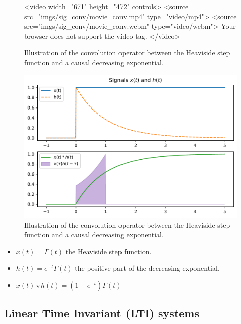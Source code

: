 \begin{warpHTML}
  \begin{figure}[ht]
    \centering
    <video width="671" height="472" controls>
    <source src="imgs/sig\_conv/movie\_conv.mp4" type="video/mp4">
    <source src="imgs/sig\_conv/movie\_conv.webm" type="video/webm">
    Your browser does not support the video tag.
    </video>   
    \caption{Illustration of the convolution operator between the Heaviside step function and a causal decreasing exponential.}
    \label{fig:convolution}
  \end{figure}
\end{warpHTML}
\begin{warpprint}
  \begin{figure}[ht]
    \centering
    \includegraphics[width=.7\linewidth]{imgs/sig_conv/signals_conv}
    \caption{Illustration of the convolution operator between the Heaviside step function and a causal decreasing exponential.}
    \label{fig:convolution}
  \end{figure}
\end{warpprint}



\begin{itemize}
\item $x(t)=\Gamma(t)$ the Heaviside step function.
\item $h(t)=e^{-t}\Gamma(t)$ the positive part of the decreasing exponential.
\item $x(t)\star h(t)=(1-e^{-t})\Gamma(t)$
\end{itemize}

\subsection{Linear Time Invariant (LTI) systems}
\label{sec:lti_systeùs}



